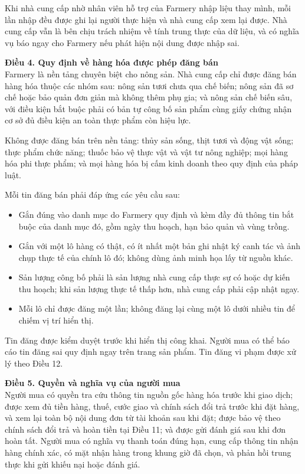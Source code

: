 Khi nhà cung cấp nhờ nhân viên hỗ trợ của Farmery nhập liệu thay mình, mỗi
lần nhập đều được ghi lại người thực hiện và nhà cung cấp xem lại được. Nhà
cung cấp vẫn là bên chịu trách nhiệm về tính trung thực của dữ liệu, và có
nghĩa vụ báo ngay cho Farmery nếu phát hiện nội dung được nhập sai.

\noindent\textbf{Điều 4. Quy định về hàng hóa được phép đăng bán}\\
Farmery là nền tảng chuyên biệt cho nông sản. Nhà cung cấp chỉ được đăng bán
hàng hóa thuộc các nhóm sau: nông sản tươi chưa qua chế biến; nông sản đã sơ
chế hoặc bảo quản đơn giản mà không thêm phụ gia; và nông sản chế biến sâu,
với điều kiện bắt buộc phải có bản tự công bố sản phẩm cùng giấy chứng nhận
cơ sở đủ điều kiện an toàn thực phẩm còn hiệu lực.

Không được đăng bán trên nền tảng: thủy sản sống, thịt tươi và động vật
sống; thực phẩm chức năng; thuốc bảo vệ thực vật và vật tư nông nghiệp; mọi
hàng hóa phi thực phẩm; và mọi hàng hóa bị cấm kinh doanh theo quy định của
pháp luật.

Mỗi tin đăng bán phải đáp ứng các yêu cầu sau:
\begin{itemize}
    \item Gắn đúng vào danh mục do Farmery quy định và kèm đầy đủ thông tin bắt
    buộc của danh mục đó, gồm ngày thu hoạch, hạn bảo quản và vùng trồng.
    \item Gắn với một lô hàng có thật, có ít nhất một bản ghi nhật ký canh tác
    và ảnh chụp thực tế của chính lô đó; không dùng ảnh minh họa lấy từ nguồn
    khác.
    \item Sản lượng công bố phải là sản lượng nhà cung cấp thực sự có hoặc dự
    kiến thu hoạch; khi sản lượng thực tế thấp hơn, nhà cung cấp phải cập nhật
    ngay.
    \item Mỗi lô chỉ được đăng một lần; không đăng lại cùng một lô dưới nhiều tin
    để chiếm vị trí hiển thị.
\end{itemize}
Tin đăng được kiểm duyệt trước khi hiển thị công khai. Người mua có thể báo
cáo tin đăng sai quy định ngay trên trang sản phẩm. Tin đăng vi phạm được xử
lý theo Điều 12.

\noindent\textbf{Điều 5. Quyền và nghĩa vụ của người mua}\\
Người mua có quyền tra cứu thông tin nguồn gốc hàng hóa trước khi giao dịch;
được xem đủ tiền hàng, thuế, cước giao và chính sách đổi trả trước khi đặt
hàng, và xem lại toàn bộ nội dung đơn từ tài khoản sau khi đặt; được bảo vệ
theo chính sách đổi trả và hoàn tiền tại Điều 11; và được gửi đánh giá sau
khi đơn hoàn tất. Người mua có nghĩa vụ thanh toán đúng hạn, cung cấp thông
tin nhận hàng chính xác, có mặt nhận hàng trong khung giờ đã chọn, và phản
hồi trung thực khi gửi khiếu nại hoặc đánh giá.

